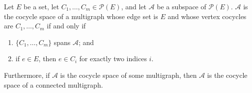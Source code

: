 Let $E$ be a set, let $C_1, \ldots, C_m \in \mathcal{P}(E)$, and let $\mathcal{A}$ be a subspace of $\mathcal{P}(E)$. $\mathcal{A}$ is the cocycle space of a multigraph whose edge set is $E$ and whose vertex cocycles are $C_1, \ldots, C_m$ if and only if
\begin{enumerate}
\item[(a)] $\{C_1, \ldots, C_m\}$ spans $\mathcal{A}$; and
\item[(b)] if $e \in E$, then $e \in C_i$ for exactly two indices $i$.
\end{enumerate}
Furthermore, if $\mathcal{A}$ is the cocycle space of some multigraph, then $\mathcal{A}$ is the cocycle space of a connected multigraph.